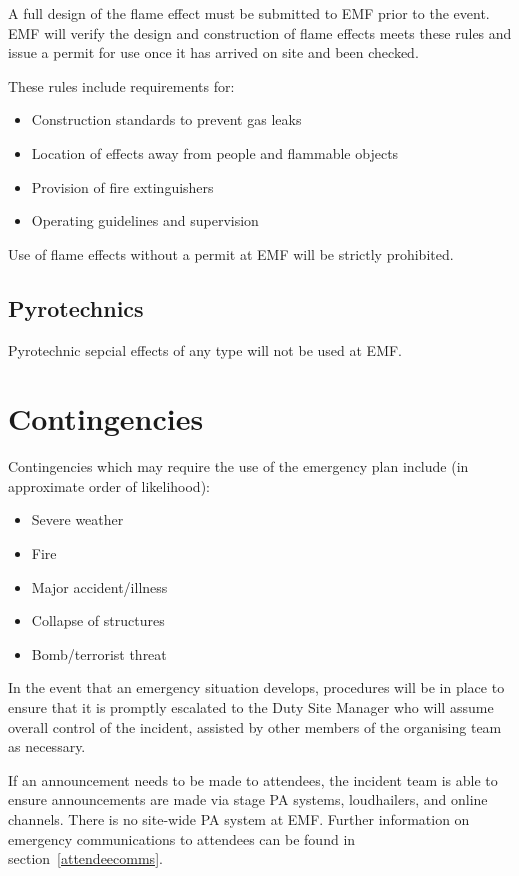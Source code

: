 A full design of the flame effect must be submitted to EMF prior to the
event. EMF will verify the design and construction of flame effects meets
these rules and issue a permit for use once it has arrived on site and
been checked.

These rules include requirements for:
\begin{itemize}
    \item Construction standards to prevent gas leaks
    \item Location of effects away from people and flammable objects
    \item Provision of fire extinguishers
    \item Operating guidelines and supervision
\end{itemize}

Use of flame effects without a permit at EMF will be strictly prohibited.

\subsection{Pyrotechnics}
Pyrotechnic sepcial effects of any type will not be used at EMF.

\section{Contingencies}\label{contingencies}
Contingencies which may require the use of the emergency plan include (in
approximate order of likelihood):

\begin{itemize}
  \item Severe weather
  \item Fire
  \item Major accident/illness
  \item Collapse of structures
  \item Bomb/terrorist threat
\end{itemize}

In the event that an emergency situation develops, procedures will be in place
to ensure that it is promptly escalated to the Duty Site Manager who will assume
overall control of the incident, assisted by other members of the organising
team as necessary.

If an announcement needs to be made to attendees, the incident team is able to
ensure announcements are made via stage PA systems, loudhailers, and online channels.
There is no site-wide PA system at EMF\@. Further information on emergency communications
to attendees can be found in section~\ref{attendeecomms}.

